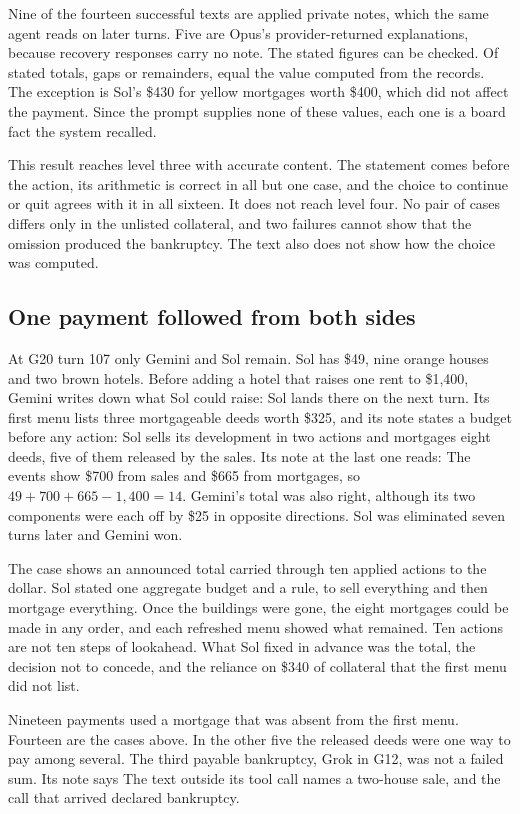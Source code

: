 Nine of the fourteen successful texts are applied private notes, which the same agent reads on later turns. Five are Opus's provider-returned explanations, because recovery responses carry no note. The stated figures can be checked. Of  stated totals, gaps or remainders,  equal the value computed from the records. The exception is Sol's \$430 for yellow mortgages worth \$400, which did not affect the payment. Since the prompt supplies none of these values, each one is a board fact the system recalled.

This result reaches level three with accurate content. The statement comes before the action, its arithmetic is correct in all but one case, and the choice to continue or quit agrees with it in all sixteen. It does not reach level four. No pair of cases differs only in the unlisted collateral, and two failures cannot show that the omission produced the bankruptcy. The text also does not show how the choice was computed.

\subsection{One payment followed from both sides}
At G20 turn 107 only Gemini and Sol remain. Sol has \$49, nine orange houses and two brown hotels. Before adding a hotel that raises one rent to \$1,400, Gemini writes down what Sol could raise:
Sol lands there on the next turn. Its first menu lists three mortgageable deeds worth \$325, and its note states a budget before any action:
Sol sells its development in two actions and mortgages eight deeds, five of them released by the sales. Its note at the last one reads:
The events show \$700 from sales and \$665 from mortgages, so $49+700+665-1{,}400=14$. Gemini's total was also right, although its two components were each off by \$25 in opposite directions. Sol was eliminated seven turns later and Gemini won.

The case shows an announced total carried through ten applied actions to the dollar. Sol stated one aggregate budget and a rule, to sell everything and then mortgage everything. Once the buildings were gone, the eight mortgages could be made in any order, and each refreshed menu showed what remained. Ten actions are not ten steps of lookahead. What Sol fixed in advance was the total, the decision not to concede, and the reliance on \$340 of collateral that the first menu did not list.

Nineteen payments used a mortgage that was absent from the first menu. Fourteen are the cases above. In the other five the released deeds were one way to pay among several. The third payable bankruptcy, Grok in G12, was not a failed sum. Its note says  The text outside its tool call names a two-house sale, and the call that arrived declared bankruptcy.
